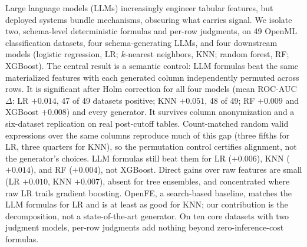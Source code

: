 Large language models (LLMs) increasingly engineer tabular features, but deployed systems bundle mechanisms, obscuring what carries signal. We isolate two, schema-level deterministic formulas and per-row judgments, on 49 OpenML classification datasets, four schema-generating LLMs, and four downstream models (logistic regression, LR; \(k\)-nearest neighbors, KNN; random forest, RF; XGBoost). The central result is a semantic control: LLM formulas beat the same materialized features with each generated column independently permuted across rows. It is significant after Holm correction for all four models (mean ROC-AUC \(\Delta\): LR \(+0.014\), 47 of 49 datasets positive; KNN \(+0.051\), 48 of 49; RF \(+0.009\) and XGBoost \(+0.008\)) and every generator. It survives column anonymization and a six-dataset replication on real post-cutoff tables. Count-matched random valid expressions over the same columns reproduce much of this gap (three fifths for LR, three quarters for KNN), so the permutation control certifies alignment, not the generator's choices. LLM formulas still beat them for LR (\(+0.006\)), KNN (\(+0.014\)), and RF (\(+0.004\)), not XGBoost. Direct gains over raw features are small (LR \(+0.010\), KNN \(+0.007\)), absent for tree ensembles, and concentrated where raw LR trails gradient boosting. OpenFE, a search-based baseline, matches the LLM formulas for LR and is at least as good for KNN; our contribution is the decomposition, not a state-of-the-art generator. On ten core datasets with two judgment models, per-row judgments add nothing beyond zero-inference-cost formulas.
